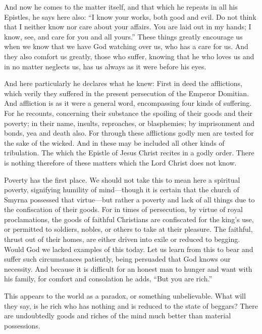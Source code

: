 And now he comes to the matter itself, and that which he repeats in all his Epistles, he says here also: “I know your works, both good and evil. Do not think that I neither know nor care about your affairs. You are laid out in my hands; I know, see, and care for you and all yours.” These things greatly encourage us when we know that we have God watching over us, who has a care for us. And they also comfort us greatly, those who suffer, knowing that he who loves us and in no matter neglects us, has us always as it were before his eyes.

And here particularly he declares what he knew: First in deed the afflictions, which verily they suffered in the present persecution of the Emperor Domitian. And affliction is as it were a general word, encompassing four kinds of suffering. For he recounts, concerning their substance the spoiling of their goods and their poverty; in their name, insults, reproaches, or blasphemies; by imprisonment and bonds, yea and death also. For through these afflictions godly men are tested for the sake of the wicked. And in these may be included all other kinds of tribulation. The which the Epistle of Jesus Christ recites in a godly order. There is nothing therefore of these matters which the Lord Christ does not know.

Poverty has the first place. We should not take this to mean here a spiritual poverty, signifying humility of mind—though it is certain that the church of Smyrna possessed that virtue—but rather a poverty and lack of all things due to the confiscation of their goods. For in times of persecution, by virtue of royal proclamations, the goods of faithful Christians are confiscated for the king’s use, or permitted to soldiers, nobles, or others to take at their pleasure. The faithful, thrust out of their homes, are either driven into exile or reduced to begging. Would God we lacked examples of this today. Let us learn from this to bear and suffer such circumstances patiently, being persuaded that God knows our necessity. And because it is difficult for an honest man to hunger and want with his family, for comfort and consolation he adds, “But you are rich.”

This appears to the world as a paradox, or something unbelievable. What will they say, is he rich who has nothing and is reduced to the state of beggars? There are undoubtedly goods and riches of the mind much better than material possessions.

